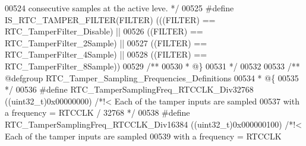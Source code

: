 \begin{DoxyCode}
00524 \textcolor{comment}{                                                          consecutive samples at the active leve. */}
00525 \textcolor{preprocessor}{#}\textcolor{preprocessor}{define} \textcolor{preprocessor}{IS\_RTC\_TAMPER\_FILTER}\textcolor{preprocessor}{(}\textcolor{preprocessor}{FILTER}\textcolor{preprocessor}{)} \textcolor{preprocessor}{(}\textcolor{preprocessor}{(}\textcolor{preprocessor}{(}\textcolor{preprocessor}{FILTER}\textcolor{preprocessor}{)} \textcolor{preprocessor}{==} RTC_TamperFilter_Disable\textcolor{preprocessor}{)} \textcolor{preprocessor}{||}
00526                                       \textcolor{preprocessor}{(}\textcolor{preprocessor}{(}\textcolor{preprocessor}{FILTER}\textcolor{preprocessor}{)} \textcolor{preprocessor}{==} RTC_TamperFilter_2Sample\textcolor{preprocessor}{)} \textcolor{preprocessor}{||}
00527                                       \textcolor{preprocessor}{(}\textcolor{preprocessor}{(}\textcolor{preprocessor}{FILTER}\textcolor{preprocessor}{)} \textcolor{preprocessor}{==} RTC_TamperFilter_4Sample\textcolor{preprocessor}{)} \textcolor{preprocessor}{||}
00528                                       \textcolor{preprocessor}{(}\textcolor{preprocessor}{(}\textcolor{preprocessor}{FILTER}\textcolor{preprocessor}{)} \textcolor{preprocessor}{==} RTC_TamperFilter_8Sample\textcolor{preprocessor}{)}\textcolor{preprocessor}{)}
00529 \textcolor{comment}{/**}
00530 \textcolor{comment}{  * @\}}
00531 \textcolor{comment}{  */}
00532 
00533 \textcolor{comment}{/** @defgroup RTC\_Tamper\_Sampling\_Frequencies\_Definitions }
00534 \textcolor{comment}{  * @\{}
00535 \textcolor{comment}{  */}
00536 \textcolor{preprocessor}{#}\textcolor{preprocessor}{define} \textcolor{preprocessor}{RTC\_TamperSamplingFreq\_RTCCLK\_Div32768}  \textcolor{preprocessor}{(}\textcolor{preprocessor}{(}\textcolor{preprocessor}{uint32\_t}\textcolor{preprocessor}{)}0x00000000\textcolor{preprocessor}{)} \textcolor{comment}{/*!< Each of the tamper inputs
       are sampled}
00537 \textcolor{comment}{                                                                           with a frequency =  RTCCLK
       / 32768 */}
00538 \textcolor{preprocessor}{#}\textcolor{preprocessor}{define} \textcolor{preprocessor}{RTC\_TamperSamplingFreq\_RTCCLK\_Div16384}  \textcolor{preprocessor}{(}\textcolor{preprocessor}{(}\textcolor{preprocessor}{uint32\_t}\textcolor{preprocessor}{)}0x000000100\textcolor{preprocessor}{)} \textcolor{comment}{/*!< Each of the tamper inputs
       are sampled}
00539 \textcolor{comment}{                                                                            with a frequency =  RTCCLK
}
\end{DoxyCode}
